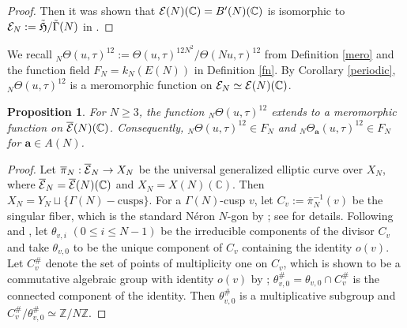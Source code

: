 \documentclass[12pt,amstex,amssymb]{article}
\theoremstyle{plain}
\newtheorem{proposition}[theorem]{Proposition}
\theoremstyle{definition}
\def\cE{{\cal E}}
\def\fH{{\frak H}}
\def\cM{{\cal M}}
\def\Z{{\mathbb Z}}
\def\C{{\mathbb C}}
\def\Q{{\mathbb Q}}
\newcommand{\ba}{\mathbf{a}}
\newcommand{\Spec}{\operatorname{Spec}}
\newcommand{\Ell}{\operatorname{Ell}}
\begin{document}
{\begin{proof}
Then it was shown that $\cE(N)(\C) =B'(N)(\C)$ is isomorphic to $\cE_N:=\tilde \fH/\tilde \Gamma(N)$ in \cite[(5.7) and p. 39]{Shioda}.
\end{proof}





We recall $_{N}\!\Theta(u,\tau)^{12} :=  \Theta(u,\tau)^{12 N^2}/\Theta(Nu,\tau)^{12}$ from Definition \ref{mero} and the function field $F_N=k_N(E(N))$ in Definition \ref{fn}.
    By Corollary \ref{periodic}, $_{N}\!\Theta(u,\tau)^{12}$ is a meromorphic function on $\cE_N\simeq\cE(N)(\C)$.
    \begin{proposition} \label{rationality}
        For $N\geq 3$, the function $_{N}\!\Theta(u,\tau)^{12}$ extends to a meromorphic function on $\overline \cE(N)(\C)$. Consequently, $_{N}\!\Theta(u,\tau)^{12} \in F_N$ and $_{N}\!\Theta_\ba(u,\tau)^{12} \in F_N$ for $\ba \in A(N)$.
    \end{proposition}
    \begin{proof}
    Let $\overline \pi_N:\overline \cE_N \to X_N$ be the universal generalized elliptic curve over $X_N$, where $\overline \cE_N=\overline \cE(N)(\C)$ and $X_N=X(N)(\C)$. 
    Then $X_N=Y_N \sqcup \{\Gamma(N)-\text{cusps}\}$.
    For a $\Gamma(N)$-cusp $v$, let $C_v:=\overline \pi_N^{-1}(v)$ be the singular fiber, which is the standard N\'eron $N$-gon by \cite{Kodaira}; see \cite[Proposition 4.2, Theorem 5.2 (iii), and Example 5.4]{Shioda} for details. 
    Following \cite{Shioda} and \cite{Kodaira}, let $\theta_{v,i}$ $(0 \leq i \leq N-1)$ be the irreducible components of the divisor $C_v$ and take $\theta_{v,0}$ to be the unique component of $C_v$ containing the identity $o(v)$. 
    Let $C_v^\#$ denote the set of points of multiplicity one on $C_v$, which is shown to be a commutative algebraic group with identity $o(v)$ by \cite[Section 9]{Kodaira}; $\theta_{v,0}^\# =\theta_{v,0}\cap C_v^\#$ is the connected component of the identity. 
    Then $\theta_{v,0}^\#$ is a multiplicative subgroup and $C_v^\#/\theta_{v,0}^\# \simeq \Z/N\Z$.
    

\end{proof}}
\end{document}
